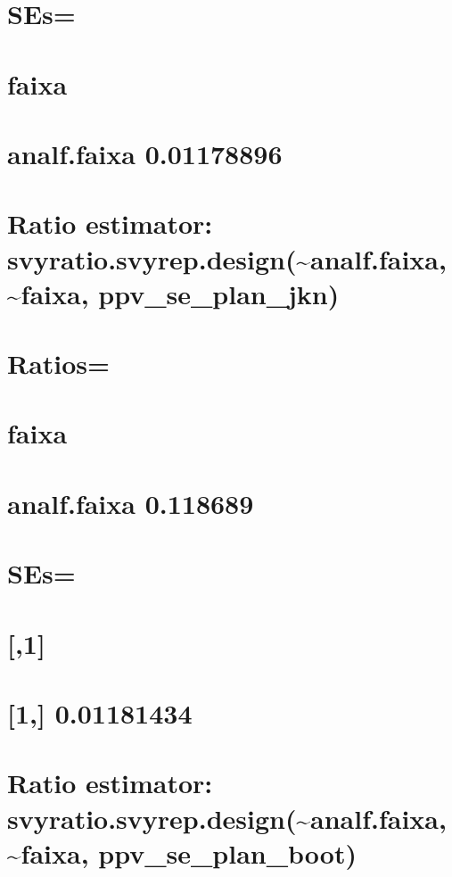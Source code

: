 \documentclass[]{book}
\theoremstyle{definition}
\theoremstyle{definition}
\theoremstyle{definition}
\theoremstyle{remark}
\begin{document}
\section{SEs=}\label{ses-2}

\section{faixa}\label{faixa-2}

\section{analf.faixa 0.01178896}\label{analf.faixa-0.01178896}

\section{Ratio estimator:
svyratio.svyrep.design(\textasciitilde{}analf.faixa,
\textasciitilde{}faixa,
ppv\_se\_plan\_jkn)}\label{ratio-estimator-svyratio.svyrep.designanalf.faixa-faixa-ppv_se_plan_jkn}

\section{Ratios=}\label{ratios-3}

\section{faixa}\label{faixa-3}

\section{analf.faixa 0.118689}\label{analf.faixa-0.118689-1}

\section{SEs=}\label{ses-3}

\section{{[},1{]}}\label{section-11}

\section{{[}1,{]} 0.01181434}\label{section-12}

\section{Ratio estimator:
svyratio.svyrep.design(\textasciitilde{}analf.faixa,
\textasciitilde{}faixa,
ppv\_se\_plan\_boot)}\label{ratio-estimator-svyratio.svyrep.designanalf.faixa-faixa-ppv_se_plan_boot}
\end{document}
